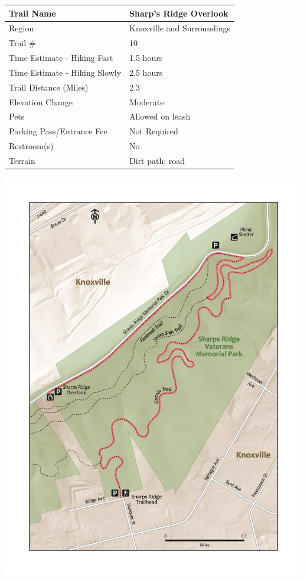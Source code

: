 \documentclass[
  letterpaper,
  DIV=11,
  numbers=noendperiod]{scrartcl}
\begin{document}
\begin{longtable}[]{@{}ll@{}}
\toprule\noalign{}
Trail Name & Sharp's Ridge Overlook \\
\midrule\noalign{}
\endhead
\bottomrule\noalign{}
\endlastfoot
Region & Knoxville and Surroundings \\
Trail \# & 10 \\
Time Estimate - Hiking Fast & 1.5 hours \\
Time Estimate - Hiking Slowly & 2.5 hours \\
Trail Distance (Miles) & 2.3 \\
Elevation Change & Moderate \\
Pets & Allowed on leash \\
Parking Pass/Entrance Fee & Not Required \\
Restroom(s) & No \\
Terrain & Dirt path; road \\
\end{longtable}

\includegraphics{maps/trail-10-map.jpeg}
\end{document}

